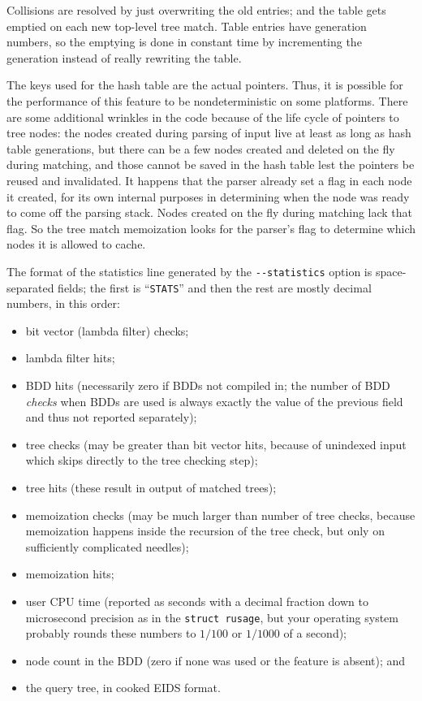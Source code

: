 \documentclass[twocolumn]{report}
\begin{document}
Collisions are resolved by just overwriting the old entries; and the table
gets emptied on each new top-level tree match.  Table entries have
generation numbers, so the emptying is done in constant time by
incrementing the generation instead of really rewriting the table.

The keys used for the hash table are the actual pointers.  Thus, it is
possible for the performance of this feature to be nondeterministic on some
platforms.  There are some additional wrinkles in the code because of the
life cycle of pointers to tree nodes: the nodes created during parsing of
input live at least as long as hash table generations, but there can be a
few nodes created and deleted on the fly during matching, and those cannot
be saved in the hash table lest the pointers be reused and invalidated.  It
happens that the parser already set a flag in each node it created, for its
own internal purposes in determining when the node was ready to come off the
parsing stack.  Nodes created on the fly during matching lack that flag.  So
the tree match memoization looks for the parser's flag to determine which
nodes it is allowed to cache.

The format of the statistics line generated by the \texttt{-{}-statistics}
option is space-separated fields; the first is ``\texttt{STATS}'' and then
the rest are mostly decimal numbers, in this order:
\begin{itemize}
  \item bit vector (lambda filter) checks;
  \item lambda filter hits;
  \item BDD hits (necessarily zero if BDDs not compiled in; the
    number of BDD \emph{checks} when BDDs are used
    is always exactly the value of the previous
    field and thus not reported separately);
  \item tree checks (may be greater than bit vector hits, because
    of unindexed input which skips directly to the tree checking step);
  \item tree hits (these result in output of matched trees);
  \item memoization checks (may be much larger than number of tree checks,
    because memoization happens inside the recursion of the tree check, but
    only on sufficiently complicated needles);
  \item memoization hits;
  \item user CPU time (reported as seconds with a decimal fraction down to
    microsecond precision as in the \texttt{struct rusage},
    but your operating system probably rounds these numbers
    to $1/100$ or $1/1000$ of a second);
  \item node count in the BDD (zero if none was used or the feature is
    absent); and
  \item the query tree, in cooked EIDS format.
\end{itemize}
\end{document}
